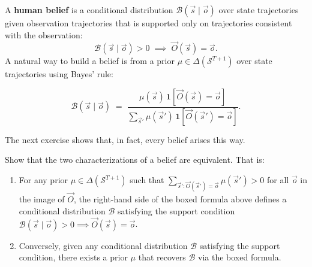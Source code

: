 \documentclass[11pt]{article}
\newcommand{\cS}{\mathcal{S}}
\newcommand{\cB}{\mathcal{B}}
\begin{document}

\begin{definition}\label{def:belief}
A \textbf{human belief} is a conditional distribution
$\cB(\vec s \mid \vec o)$ over state trajectories given observation
trajectories that is supported only on trajectories consistent with the
observation:
$$
\cB(\vec s \mid \vec o) > 0 \;\implies\; \vec O(\vec s) = \vec o.
$$
A natural way to build a belief is from a prior $\mu \in \Delta(\cS^{T+1})$
over state trajectories using Bayes' rule:
\begin{callout}
$$
\cB(\vec s \mid \vec o) \;=\; \frac{\mu(\vec s)\,\mathbf{1}[\vec O(\vec s) = \vec o]}
{\sum_{\vec s'} \mu(\vec s')\,\mathbf{1}[\vec O(\vec s') = \vec o]}.
$$
\end{callout}
The next exercise shows that, in fact, every belief arises this way.
\end{definition}


\begin{exercise}
\label{prob:belief_equiv}
Show that the two characterizations
of a belief are equivalent. That is:
\begin{enumerate}
    \item For any prior $\mu \in \Delta(\cS^{T+1})$ such that
        $\sum_{\vec s' : \vec O(\vec s') = \vec o} \mu(\vec s') > 0$ for
        all $\vec o$ in the image of $\vec O$, the right-hand side of the
        boxed formula above defines a conditional distribution $\cB$
        satisfying the support condition
        $\cB(\vec s \mid \vec o) > 0 \implies \vec O(\vec s) = \vec o$.
    \item Conversely, given any conditional distribution $\cB$ satisfying
        the support condition, there exists a prior $\mu$ that recovers
        $\cB$ via the boxed formula.
\end{enumerate}
\end{exercise}
\end{document}
